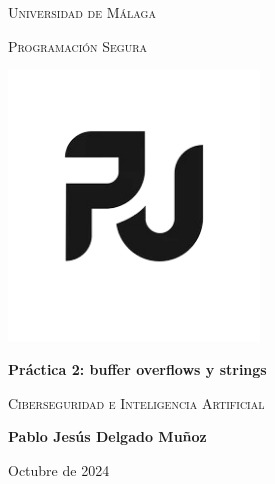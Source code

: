 \renewcommand{\thepage}{\expandafter{\romannumeral\value{page}}}
\begin{titlepage}
    \centering
    {\scshape\large Universidad de Málaga \par}
    \vspace{0.3cm}
    {\scshape\large Programación Segura \par}
     \vspace{0.3cm}
     
    \includegraphics[width=0.5\textwidth]{frontmatter/simple-black-pj-logo-vector-260nw-1799911108-removebg-preview.png}\\[0.3cm]
    {\LARGE\bfseries Práctica 2: buffer overflows y strings \par}
    \vspace{0.3cm}
     {\scshape\large Ciberseguridad e Inteligencia Artificial \par}
    \vspace{0.3cm}
    
    {\Large\bfseries Pablo Jesús Delgado Muñoz \par}
    \vspace{0.5cm}
    \vfill
    
    
    {\large Octubre de 2024\par}
    \vspace{1cm}


\let\cleardoublepage\clearpage
\tableofcontents
\let\cleardoublepage\clearpage

\end{titlepage}

